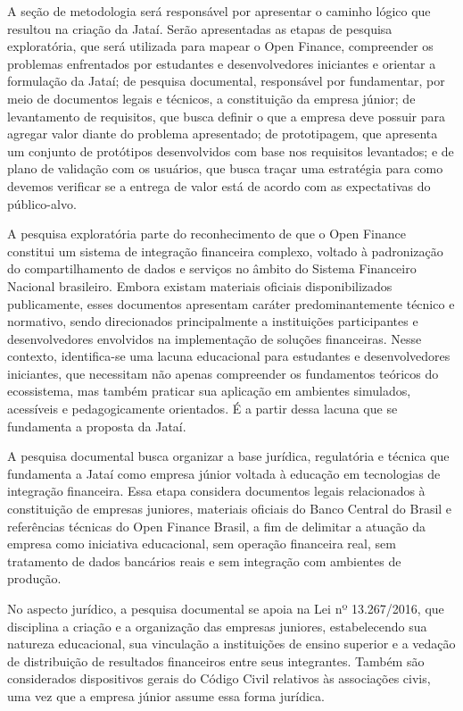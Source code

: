 \documentclass[
  12pt,
  openright,
  oneside,
  a4paper,
  brazilian
]{abntex2}
\newcommand{\sfn}{Sistema Financeiro Nacional}
\begin{document}
A seção de metodologia será responsável por apresentar o caminho lógico que resultou na criação da Jataí. Serão apresentadas as etapas de pesquisa exploratória, que será utilizada para mapear o Open Finance, compreender os problemas enfrentados por estudantes e desenvolvedores iniciantes e orientar a formulação da Jataí; de pesquisa documental, responsável por fundamentar, por meio de documentos legais e técnicos, a constituição da empresa júnior; de levantamento de requisitos, que busca definir o que a empresa deve possuir para agregar valor diante do problema apresentado; de prototipagem, que apresenta um conjunto de protótipos desenvolvidos com base nos requisitos levantados; e de plano de validação com os usuários, que busca traçar uma estratégia para como devemos verificar se a entrega de valor está de acordo com as expectativas do público-alvo.


A pesquisa exploratória parte do reconhecimento de que o Open Finance constitui um sistema de integração financeira complexo, voltado à padronização do compartilhamento de dados e serviços no âmbito do \sfn{} brasileiro. Embora existam materiais oficiais disponibilizados publicamente, esses documentos apresentam caráter predominantemente técnico e normativo, sendo direcionados principalmente a instituições participantes e desenvolvedores envolvidos na implementação de soluções financeiras. Nesse contexto, identifica-se uma lacuna educacional para estudantes e desenvolvedores iniciantes, que necessitam não apenas compreender os fundamentos teóricos do ecossistema, mas também praticar sua aplicação em ambientes simulados, acessíveis e pedagogicamente orientados. É a partir dessa lacuna que se fundamenta a proposta da Jataí.


A pesquisa documental busca organizar a base jurídica, regulatória e técnica que fundamenta a Jataí como empresa júnior voltada à educação em tecnologias de integração financeira. Essa etapa considera documentos legais relacionados à constituição de empresas juniores, materiais oficiais do Banco Central do Brasil e referências técnicas do Open Finance Brasil, a fim de delimitar a atuação da empresa como iniciativa educacional, sem operação financeira real, sem tratamento de dados bancários reais e sem integração com ambientes de produção.

No aspecto jurídico, a pesquisa documental se apoia na Lei nº 13.267/2016, que disciplina a criação e a organização das empresas juniores, estabelecendo sua natureza educacional, sua vinculação a instituições de ensino superior e a vedação de distribuição de resultados financeiros entre seus integrantes. Também são considerados dispositivos gerais do Código Civil relativos às associações civis, uma vez que a empresa júnior assume essa forma jurídica.
\end{document}
